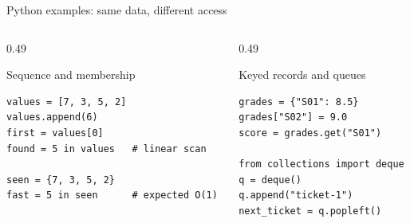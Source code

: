 \documentclass[aspectratio=169]{beamer}
\begin{document}
\begin{frame}[fragile]{Python examples: same data, different access}
\small
\begin{columns}[T,onlytextwidth]
\begin{column}{0.49\textwidth}
\begin{block}{Sequence and membership}
\begin{lstlisting}[style=py]
values = [7, 3, 5, 2]
values.append(6)
first = values[0]
found = 5 in values   # linear scan

seen = {7, 3, 5, 2}
fast = 5 in seen      # expected O(1)
\end{lstlisting}
\end{block}
\end{column}
\begin{column}{0.49\textwidth}
\begin{exampleblock}{Keyed records and queues}
\begin{lstlisting}[style=py]
grades = {"S01": 8.5}
grades["S02"] = 9.0
score = grades.get("S01")

from collections import deque
q = deque()
q.append("ticket-1")
next_ticket = q.popleft()
\end{lstlisting}
\end{exampleblock}
\end{column}
\end{columns}
\end{frame}
\end{document}
